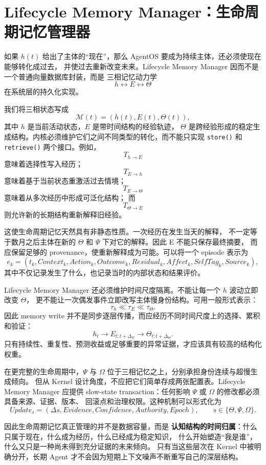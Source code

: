 \section{Lifecycle Memory Manager：生命周期记忆管理器}

如果 $h(t)$ 给出了主体的``现在''，那么 AgentOS 要成为持续主体，还必须使现在能够转化成过去，
并使过去重新改变未来。Lifecycle Memory Manager 因而不是一个普通向量数据库封装，而是
三相记忆动力学
\[
h\leftrightarrow E\leftrightarrow\Theta
\]
在系统层的持久化实现。

我们将三相状态写成
\[
\mathcal M(t)
=
\left(
h(t),E(t),\Theta(t)
\right),
\]
其中 $h$ 是当前活动状态，$E$ 是带时间结构的经验轨迹，
$\Theta$ 是跨经验形成的稳定生成结构。内核必须维护它们之间不同类型的转化，而不能只实现
\texttt{store()} 和 \texttt{retrieve()} 两个接口。例如，
\[
T_{h\rightarrow E}
\]
意味着选择性写入经历；
\[
T_{E\rightarrow h}
\]
意味着基于当前状态重激活过去情境；
\[
T_{E\rightarrow\Theta}
\]
意味着从多次经历中形成可泛化结构；
而
\[
T_{\Theta\rightarrow E}
\]
则允许新的长期结构重新解释旧经验。

这使生命周期记忆天然具有非静态性质。一次经历在发生当天的解释，
不一定等于数月之后主体在新的 $\Theta$ 和 $\Psi$ 下对它的解释。因此 E 不能只保存最终摘要，
而应保留足够的 provenance，使重新解释成为可能。可以将一个 episode 表示为
\[
e_k=
(
t_k,
Context_k,
Action_k,
Outcome_k,
Residual_k,
Affect_k,
SelfTag_k,
Source_k
),
\]
其中不仅记录发生了什么，也记录当时的内部状态和结果评价。

Lifecycle Memory Manager 还必须维护时间尺度隔离。不能让每一个 $h$ 波动立即改变 $\Theta$，
更不能让一次偶发事件立即改写主体慢身份结构。可用一般形式表示：
\[
\tau_h\ll\tau_E\ll\tau_\Theta.
\]
因此 memory write 并不是同步逐层传播，而应经历不同时间尺度上的选择、累积和验证：
\[
h_t
\rightarrow
E_{t:t+\Delta_E}
\rightarrow
\Theta_{t:t+\Delta_\Theta}.
\]
只有持续性、重复性、预测收益或足够重要的异常证据，才应该具有较高的结构化权重。

在更完整的生命周期中，$\Psi$ 与 $\Omega$ 位于三相记忆之上，分别承担身份连续与超慢生成倾向。
但从 Kernel 设计角度，不应把它们简单存成两张配置表。Lifecycle Memory Manager 应提供
slow-state transaction：任何影响 $\Psi$ 或 $\Omega$ 的修改都必须具备来源、证据、版本、
回滚点和治理权限。这种机制可以形式化为
\[
Update_s
=
(\Delta s, Evidence, Confidence, Authority, Epoch),
\qquad
s\in\{\Theta,\Psi,\Omega\}.
\]

因此生命周期记忆真正管理的并不是数据容量，而是
\textbf{认知结构的时间归属}：什么只属于现在，什么成为经历，什么已经成为稳定知识，
什么开始塑造``我是谁''，什么又只是一种尚未得到充分证据的未来倾向。
只有当这些层次在 Kernel 中被明确分开，长期 Agent 才不会因为短期上下文噪声不断重写自己的深层结构。


